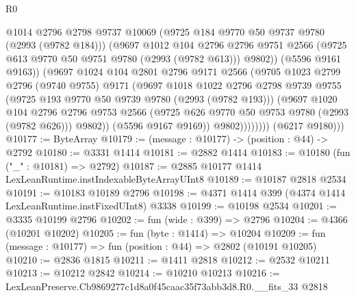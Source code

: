\begin{lexlean}{R0}
\begin{coremodule}
                          @1014
                          @2796
                          @2798
                          @9737
                          @10069
                          (@9725 @184 @9770 @50 @9737 @9780 (@2993 (@9782 @184)))
                          (@9697
                            @1012
                            @104
                            @2796
                            @2796
                            @9751
                            @2566
                            (@9725 @613 @9770 @50 @9751 @9780 (@2993 (@9782 @613)))
                            @9802))
                        (@5596 @9161 @9163))
                      (@9697
                        @1024
                        @104
                        @2801
                        @2796
                        @9171
                        @2566
                        (@9705
                          @1023
                          @2799
                          @2796
                          (@9740 @9755)
                          @9171
                          (@9697
                            @1018
                            @1022
                            @2796
                            @2798
                            @9739
                            @9755
                            (@9725 @193 @9770 @50 @9739 @9780 (@2993 (@9782 @193)))
                            (@9697
                              @1020
                              @104
                              @2796
                              @2796
                              @9753
                              @2566
                              (@9725 @626 @9770 @50 @9753 @9780 (@2993 (@9782 @626)))
                              @9802))
                          (@5596 @9167 @9169))
                        @9802))))))))
        (@6217 @9180)))
@10177 := ByteArray
@10179 := (message : @10177) -> (position : @44) -> @2792
@10180 := @3331 @1414
@10181 := @2882 @1414
@10183 := @10180 (fun ("_" : @10181) => @2792)
@10187 := @2885 @10177 @1414 LexLeanRuntime.instIndexableByteArrayUInt8
@10189 := @10187 @2818 @2534
@10191 := @10183 @10189 @2796
@10198 := @4371 @1414 @399 (@4374 @1414 LexLeanRuntime.instFixedUInt8) @3338
@10199 := @10198 @2534
@10201 := @3335 @10199 @2796
@10202 := fun (wide : @399) => @2796
@10204 := @4366 (@10201 @10202)
@10205 := fun (byte : @1414) => @10204
@10209 := fun (message : @10177) => fun (position : @44) => @2802 (@10191 @10205)
@10210 := @2836 @1815
@10211 := @1411 @2818
@10212 := @2532 @10211
@10213 := @10212 @2842
@10214 := @10210 @10213
@10216 := LexLeanPreserve.Cb9869277c1d8a0f45caac35f73abb3d8.R0.__fits_33 @2818

\end{coremodule}
\end{lexlean}
